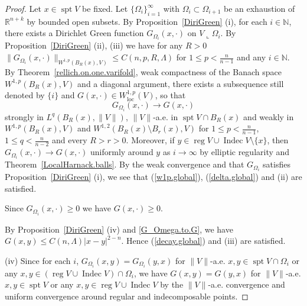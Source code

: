 \documentclass[11pt]{amsart}
\theoremstyle{definition}
\newcommand{\R}{\mathbb{R}}
\newcommand{\N}{\mathbb{N}}
\newcommand{\loc}{\mathrm{loc}}
\DeclareMathOperator{\spt}{spt}
\DeclareMathOperator{\reg}{reg}
\DeclareMathOperator{\indec}{Indec}
\begin{document}
\begin{proof}
	Let $x\in \spt V$ be fixed. Let $\{\Omega_i\}_{i=1}^\infty$ with $\Omega_i\subset \Omega_{i+1}$ be an exhaustion of $\R^{n+k}$ by bounded open subsets. By Proposition~\ref{DiriGreen} (i), for each $i\in \N$, there exists a Dirichlet Green function $G_{\Omega_i}(x,\cdot)$ on $ V\llcorner \Omega_i$. By Proposition~\ref{DiriGreen} (ii), (iii) we have for any $R>0$ $\|G_{\Omega_i}(x,\cdot)\|_{W^{1,p}(B_R(x),V)}\le C(n,p,R,\Lambda)$ for $1\le p<\frac{n}{n-1}$ and any $i\in \N$. By Theorem~\ref{rellich.on.one.varifold}, weak compactness of the Banach space $W^{1,p}(B_R(x),V)$ and a diagonal argument, there exists a subsequence still denoted by $\{i\}$ and $G(x,\cdot)\in W^{1,p}_\loc(V)$, so that 
	\begin{equation}\label{G_Omega.to.G}
		G_{\Omega_i}(x,\cdot) \to G(x,\cdot)
	\end{equation} strongly in  $L^q(B_R(x),\|V\|)$, $\|V\|$-a.e. in $\spt V\cap B_R(x)$ and weakly in $W^{1,p}(B_R(x),V)$ and $W^{1,2}(B_R(x)\setminus B_r(x),V)$ for $1\le p<\frac{n}{n-1}$, $1\le q<\frac{n}{n-2}$ and every $R>r>0$. Moreover, if $y\in \reg V\cup \indec V\setminus\{x\}$, then $G_{\Omega_i}(x,\cdot)\to G(x,\cdot)$ uniformly around $y$ as $i\to\infty$ by elliptic regularity \cite{GT} and Theorem~\ref{LocalHarnack.balls}. By the weak convergence and that $G_{\Omega_i}$ satisfies Proposition~\ref{DiriGreen} (i), we see that (\ref{w1p.global}), (\ref{delta.global}) and (ii) are satisfied.
	
	Since $G_{\Omega_i}(x,\cdot)\ge0$ we have $G(x,\cdot)\ge0$.
	
	By Proposition~\ref{DiriGreen} (iv) and \eqref{G_Omega.to.G}, we have $G(x,y)\le C(n,\Lambda)|x-y|^{2-n}$. Hence (\ref{decay.global}) and (iii) are satisfied.
	
	(iv) Since for each $i$, $G_{\Omega_i}(x,y)=G_{\Omega_i}(y,x)$ for $\|V\|$-a.e. $x,y\in \spt V\cap \Omega_i$ or any $x,y\in (\reg V\cup \indec V)\cap \Omega_i$, we have $G(x,y)=G(y,x)$ for $\|V\|$-a.e. $x,y\in \spt V$ or any $x,y\in \reg V\cup \indec V$ by the $\|V\|$-a.e. convergence and uniform convergence around regular and indecomposable points.
	

\end{proof}
\end{document}

